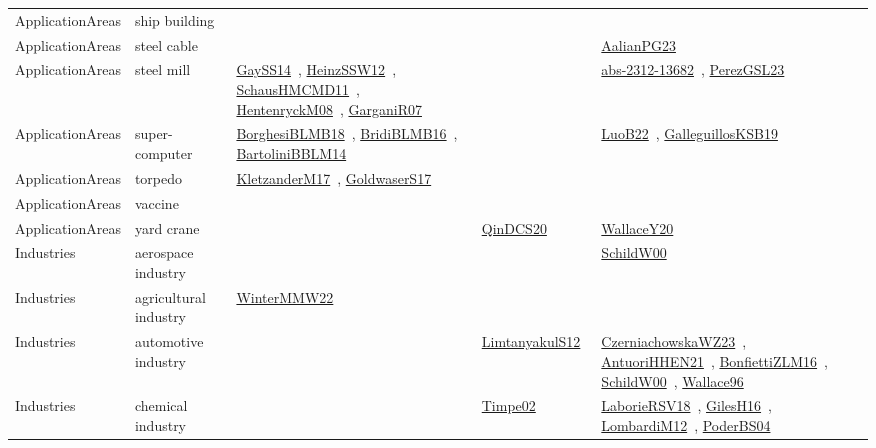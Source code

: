 {\begin{longtable}{lp{3cm}>{\raggedright\arraybackslash}p{6cm}>{\raggedright\arraybackslash}p{6cm}>{\raggedright\arraybackslash}p{8cm}}
ApplicationAreas & ship building &  &  & \\
ApplicationAreas & steel cable &  &  & \href{papers/AalianPG23.pdf}{AalianPG23}~\cite{AalianPG23}\\
ApplicationAreas & steel mill & \href{papers/GaySS14.pdf}{GaySS14}~\cite{GaySS14}, \href{articles/HeinzSSW12.pdf}{HeinzSSW12}~\cite{HeinzSSW12}, \href{articles/SchausHMCMD11.pdf}{SchausHMCMD11}~\cite{SchausHMCMD11}, \href{papers/HentenryckM08.pdf}{HentenryckM08}~\cite{HentenryckM08}, \href{papers/GarganiR07.pdf}{GarganiR07}~\cite{GarganiR07} &  & \href{articles/abs-2312-13682.pdf}{abs-2312-13682}~\cite{abs-2312-13682}, \href{papers/PerezGSL23.pdf}{PerezGSL23}~\cite{PerezGSL23}\\
ApplicationAreas & super-computer & \href{articles/BorghesiBLMB18.pdf}{BorghesiBLMB18}~\cite{BorghesiBLMB18}, \href{articles/BridiBLMB16.pdf}{BridiBLMB16}~\cite{BridiBLMB16}, \href{papers/BartoliniBBLM14.pdf}{BartoliniBBLM14}~\cite{BartoliniBBLM14} &  & \href{papers/LuoB22.pdf}{LuoB22}~\cite{LuoB22}, \href{papers/GalleguillosKSB19.pdf}{GalleguillosKSB19}~\cite{GalleguillosKSB19}\\
ApplicationAreas & torpedo & \href{papers/KletzanderM17.pdf}{KletzanderM17}~\cite{KletzanderM17}, \href{papers/GoldwaserS17.pdf}{GoldwaserS17}~\cite{GoldwaserS17} &  & \\
ApplicationAreas & vaccine &  &  & \\
ApplicationAreas & yard crane &  & \href{articles/QinDCS20.pdf}{QinDCS20}~\cite{QinDCS20} & \href{articles/WallaceY20.pdf}{WallaceY20}~\cite{WallaceY20}\\
Industries & aerospace industry &  &  & \href{articles/SchildW00.pdf}{SchildW00}~\cite{SchildW00}\\
Industries & agricultural industry & \href{papers/WinterMMW22.pdf}{WinterMMW22}~\cite{WinterMMW22} &  & \\
Industries & automotive industry &  & \href{articles/LimtanyakulS12.pdf}{LimtanyakulS12}~\cite{LimtanyakulS12} & \href{articles/CzerniachowskaWZ23.pdf}{CzerniachowskaWZ23}~\cite{CzerniachowskaWZ23}, \href{papers/AntuoriHHEN21.pdf}{AntuoriHHEN21}~\cite{AntuoriHHEN21}, \href{papers/BonfiettiZLM16.pdf}{BonfiettiZLM16}~\cite{BonfiettiZLM16}, \href{articles/SchildW00.pdf}{SchildW00}~\cite{SchildW00}, \href{articles/Wallace96.pdf}{Wallace96}~\cite{Wallace96}\\
Industries & chemical industry &  & \href{articles/Timpe02.pdf}{Timpe02}~\cite{Timpe02} & \href{articles/LaborieRSV18.pdf}{LaborieRSV18}~\cite{LaborieRSV18}, \href{papers/GilesH16.pdf}{GilesH16}~\cite{GilesH16}, \href{articles/LombardiM12.pdf}{LombardiM12}~\cite{LombardiM12}, \href{articles/PoderBS04.pdf}{PoderBS04}~\cite{PoderBS04}\\

\end{longtable}}
